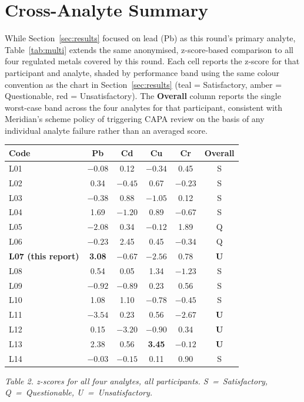 \section{Cross-Analyte Summary}
\label{sec:multi-analyte}

\newcommand{\zS}[1]{\cellcolor{ptteal!16}#1}
\newcommand{\zQ}[1]{\cellcolor{ptamber!28}#1}
\newcommand{\zU}[1]{\cellcolor{ptred!22}\textbf{#1}}

While Section~\ref{sec:results} focused on lead (Pb) as this round's primary analyte, Table~\ref{tab:multi} extends the same anonymised, z-score-based comparison to all four regulated
metals covered by this round. Each cell reports the z-score for that participant and analyte,
shaded by performance band using the same colour convention as the chart in
Section~\ref{sec:results} (teal = Satisfactory, amber = Questionable, red = Unsatisfactory). The
\textbf{Overall} column reports the single worst-case band across the four analytes for that
participant, consistent with Meridian's scheme policy of triggering CAPA review on the basis of
any individual analyte failure rather than an averaged score.

\begin{center}
\small
\begin{tabular}{@{}lccccc@{}}
\toprule
\textbf{Code} & \textbf{Pb} & \textbf{Cd} & \textbf{Cu} & \textbf{Cr} & \textbf{Overall} \\
\midrule
L01 & \zS{$-0.08$} & \zS{0.12} & \zS{$-0.34$} & \zS{0.45} & \zS{S} \\
L02 & \zS{0.34} & \zS{$-0.45$} & \zS{0.67} & \zS{$-0.23$} & \zS{S} \\
L03 & \zS{$-0.38$} & \zS{0.88} & \zS{$-1.05$} & \zS{0.12} & \zS{S} \\
L04 & \zS{1.69} & \zS{$-1.20$} & \zS{0.89} & \zS{$-0.67$} & \zS{S} \\
L05 & \zQ{$-2.08$} & \zS{0.34} & \zS{$-0.12$} & \zS{1.89} & \zQ{Q} \\
L06 & \zS{$-0.23$} & \zQ{2.45} & \zS{0.45} & \zS{$-0.34$} & \zQ{Q} \\
\rowcolor{ptnavy!10} \textbf{L07 (this report)} & \zU{3.08} & \zS{$-0.67$} & \zQ{$-2.56$} & \zS{0.78} & \zU{U} \\
L08 & \zS{0.54} & \zS{0.05} & \zS{1.34} & \zS{$-1.23$} & \zS{S} \\
L09 & \zS{$-0.92$} & \zS{$-0.89$} & \zS{0.23} & \zS{0.56} & \zS{S} \\
L10 & \zS{1.08} & \zS{1.10} & \zS{$-0.78$} & \zS{$-0.45$} & \zS{S} \\
L11 & \zU{$-3.54$} & \zS{0.23} & \zS{0.56} & \zQ{$-2.67$} & \zU{U} \\
L12 & \zS{0.15} & \zU{$-3.20$} & \zS{$-0.90$} & \zS{0.34} & \zU{U} \\
L13 & \zQ{2.38} & \zS{0.56} & \zU{3.45} & \zS{$-0.12$} & \zU{U} \\
L14 & \zS{$-0.03$} & \zS{$-0.15$} & \zS{0.11} & \zS{0.90} & \zS{S} \\
\bottomrule
\end{tabular}

\small\textit{Table 2. z-scores for all four analytes, all participants. S~=~Satisfactory, Q~=~Questionable, U~=~Unsatisfactory.}
\label{tab:multi}
\end{center}

